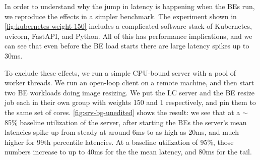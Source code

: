In order to understand why the jump in latency is happening when the BEs run, we
reproduce the effects in a simpler benchmark. The experiment shown in
\autoref{fig:kubernetes-weight-150} includes a complicated software stack of
Kubernetes, uvicorn, FastAPI, and Python. All of this has performance
implications, and we can see that even before the BE load starts there are large
latency spikes up to 30ms.

To exclude these effects, we run a simple CPU-bound server with a pool of worker
threads. We run an open-loop client on a remote machine, and then start two BE
workloads doing image resizing. We put the LC server and the BE resize job each
in their own \cgroups{} group with weights 150 and 1 respectively, and pin them
to the same set of cores. \autoref{fig:srv-bg-unedited} shows the result: we see
that at a $\sim$85\% baseline utilization of the server, after starting the BEs
the server's mean latencies spike up from steady at around 6ms to as high as
20ms, and much higher for 99th percentile latencies. At a baseline utilization
of 95\%, those numbers increase to up to 40ms for the the mean latency, and 80ms
for the tail.


